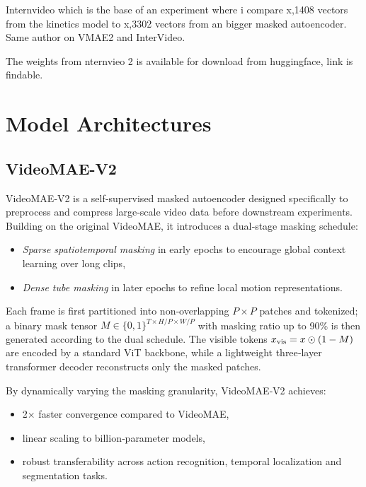 Internvideo which is the base of an experiment where i compare x,1408 vectors from the kinetics model to x,3302 vectors from an bigger masked autoencoder. Same author on VMAE2 and InterVideo. 

The weights from nternvieo 2 is available for download from huggingface, link is findable. 

\section{Model Architectures}
\label{sec:model_architectures}

\subsection{VideoMAE-V2}
\label{ssec:videomae_v2}

VideoMAE‑V2 \cite{wang_videomae_2023} is a self‑supervised masked autoencoder designed specifically to preprocess and compress large‑scale video data before downstream experiments. Building on the original VideoMAE, it introduces a dual‑stage masking schedule: 

\begin{itemize}
    \item \emph{Sparse spatiotemporal masking} in early epochs to encourage global context learning over long clips,
    \item \emph{Dense tube masking} in later epochs to refine local motion representations.
\end{itemize}
Each frame is first partitioned into non‑overlapping $P\times P$ patches and tokenized; a binary mask tensor $M\in\{0,1\}^{T\times H/P\times W/P}$ with masking ratio up to 90\% is then generated according to the dual schedule. The visible tokens $x_{\rm vis}=x\odot(1-M)$ are encoded by a standard ViT backbone, while a lightweight three‑layer transformer decoder reconstructs only the masked patches. 

By dynamically varying the masking granularity, VideoMAE‑V2 achieves:
\begin{itemize}
    \item 2× faster convergence compared to VideoMAE,
    \item linear scaling to billion‑parameter models,
    \item robust transferability across action recognition, temporal localization and segmentation tasks.
\end{itemize}

